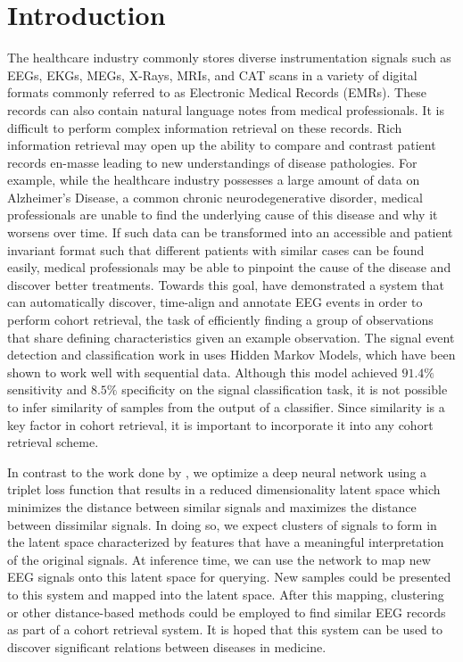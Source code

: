 \chapter{Introduction}

The healthcare industry commonly stores diverse instrumentation signals such as EEGs, EKGs, MEGs, X-Rays, MRIs, and CAT scans in a variety of digital formats commonly referred to as Electronic Medical Records (EMRs).  These records can also contain natural language notes from medical professionals. It is difficult to perform complex information retrieval on these records. Rich information retrieval may open up the ability to compare and contrast patient records en-masse leading to new understandings of disease pathologies. For example, while the healthcare industry possesses a large amount of data on Alzheimer's Disease, a common chronic neurodegenerative disorder, medical professionals are unable to find the underlying cause of this disease and why it worsens over time. If such data can be transformed into an accessible and patient invariant format such that different patients with similar cases can be found easily, medical professionals may be able to pinpoint the cause of the disease and discover better treatments. Towards this goal, \citet{piccone} have demonstrated a system that can automatically discover, time-align and annotate EEG events in order to perform cohort retrieval, the task of efficiently finding a group of observations that share defining characteristics given an example observation. The signal event detection and classification work in \citet{piccone} uses Hidden Markov Models, which have been shown to work well with sequential data. Although this model achieved $91.4\%$ sensitivity and $8.5\%$ specificity on the signal classification task, it is not possible to infer similarity of samples from the output of a classifier. Since similarity is a key factor in cohort retrieval, it is important to incorporate it into any cohort retrieval scheme.

In contrast to the work done by \citet{piccone}, we optimize a deep neural network using a triplet loss function that results in a reduced dimensionality latent space which minimizes the distance between similar signals and maximizes the distance between dissimilar signals. In doing so, we expect clusters of signals to form in the latent space characterized by features that have a meaningful interpretation of the original signals. At inference time, we can use the network to map new EEG signals onto this latent space for querying. New samples could be presented to this system and mapped into the latent space. After this mapping, clustering or other distance-based methods could be employed to find similar EEG records as part of a cohort retrieval system. It is hoped that this system can be used to discover significant relations between diseases in medicine.  

